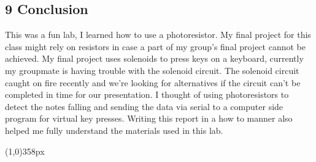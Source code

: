 \documentclass{article}
\newcommand{\enterProblemHeader}[1]{
}
\newcommand{\exitProblemHeader}[1]{
}
\newcounter{partCounter}
\newcounter{homeworkProblemCounter}
\newenvironment{homeworkProblem}[1]{
    \setcounter{partCounter}{1}
}{
}
\newcommand{\hwline}{\begin{center}\line(1,0){358px}\end{center}}
\begin{document}

\begin{homeworkProblem}{}
    \vspace{-20pt}\subsection{9 Conclusion}
    \vspace{-5pt}This was a fun lab, I learned how to use a photoresistor. My final
    project for this class might rely on resistors in case a part of my group's final
    project cannot be achieved. My final project uses solenoids to press keys on a
    keyboard, currently my groupmate is having trouble with the solenoid circuit. The 
    solenoid circuit caught on fire recently and we're looking for alternatives if
    the circuit can't be completed in time for our presentation. I thought of using
    photoresistors to detect the notes falling and sending the data via serial to a
    computer side program for virtual key presses. Writing this report in a how to
    manner also helped me fully understand the materials used in this lab.
    \hwline
\end{homeworkProblem}

\end{document}
